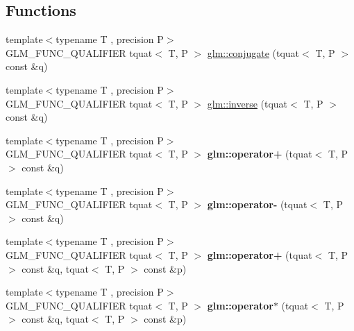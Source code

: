 \subsection*{Functions}
\begin{DoxyCompactItemize}
\item 
{\footnotesize template$<$typename T , precision P$>$ }\\G\-L\-M\-\_\-\-F\-U\-N\-C\-\_\-\-Q\-U\-A\-L\-I\-F\-I\-E\-R tquat$<$ T, P $>$ \hyperlink{group__gtc__quaternion_gab1ace864fbf189ffa368950001808a3c}{glm\-::conjugate} (tquat$<$ T, P $>$ const \&q)
\item 
{\footnotesize template$<$typename T , precision P$>$ }\\G\-L\-M\-\_\-\-F\-U\-N\-C\-\_\-\-Q\-U\-A\-L\-I\-F\-I\-E\-R tquat$<$ T, P $>$ \hyperlink{group__gtc__quaternion_ga5f47300c024c2d809944e6ac661d6d14}{glm\-::inverse} (tquat$<$ T, P $>$ const \&q)
\item 
\hypertarget{group__gtc__quaternion_ga6443d80d8429baec64193d0e31e580c8}{{\footnotesize template$<$typename T , precision P$>$ }\\G\-L\-M\-\_\-\-F\-U\-N\-C\-\_\-\-Q\-U\-A\-L\-I\-F\-I\-E\-R tquat$<$ T, P $>$ {\bfseries glm\-::operator+} (tquat$<$ T, P $>$ const \&q)}\label{group__gtc__quaternion_ga6443d80d8429baec64193d0e31e580c8}

\item 
\hypertarget{group__gtc__quaternion_ga76d2d3e18c09dbd336ba90b498fefbba}{{\footnotesize template$<$typename T , precision P$>$ }\\G\-L\-M\-\_\-\-F\-U\-N\-C\-\_\-\-Q\-U\-A\-L\-I\-F\-I\-E\-R tquat$<$ T, P $>$ {\bfseries glm\-::operator-\/} (tquat$<$ T, P $>$ const \&q)}\label{group__gtc__quaternion_ga76d2d3e18c09dbd336ba90b498fefbba}

\item 
\hypertarget{group__gtc__quaternion_ga517657374d8ca180d63c33ff9430518a}{{\footnotesize template$<$typename T , precision P$>$ }\\G\-L\-M\-\_\-\-F\-U\-N\-C\-\_\-\-Q\-U\-A\-L\-I\-F\-I\-E\-R tquat$<$ T, P $>$ {\bfseries glm\-::operator+} (tquat$<$ T, P $>$ const \&q, tquat$<$ T, P $>$ const \&p)}\label{group__gtc__quaternion_ga517657374d8ca180d63c33ff9430518a}

\item 
\hypertarget{group__gtc__quaternion_gabca7455f687e322b505531e15786d845}{{\footnotesize template$<$typename T , precision P$>$ }\\G\-L\-M\-\_\-\-F\-U\-N\-C\-\_\-\-Q\-U\-A\-L\-I\-F\-I\-E\-R tquat$<$ T, P $>$ {\bfseries glm\-::operator$\ast$} (tquat$<$ T, P $>$ const \&q, tquat$<$ T, P $>$ const \&p)}\label{group__gtc__quaternion_gabca7455f687e322b505531e15786d845}


\end{DoxyCompactItemize}

